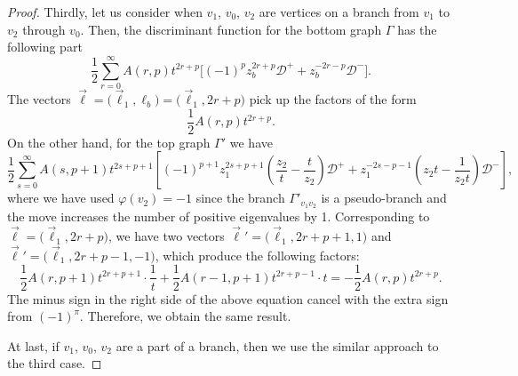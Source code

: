 \begin{proof}
	Thirdly, let us consider when $ v_1$, $v_0$, $v_2 $ are vertices on a branch from $ v_1 $ to $ v_2 $ through $ v_0 $. Then, the discriminant function for the bottom graph $ \Gamma $ has the following part
	\[
	\frac{1}{2}\sum_{r=0}^{\infty} A(r,p)t^{2r+p} \big[(-1)^p z_b^{2r+p}\mathcal{D}^{+}+z_b^{-2r-p}\mathcal{D}^{-}\big].
	\]
	The vectors $ \vec{\ell}=\big(\vec{\ell}_1,\ell_b\big)=\big(\vec{\ell}_1,2r+p\big) $ pick up the factors of the form
	\[
	\frac{1}{2}A(r,p)t^{2r+p}.
	\]
	On the other hand, for the top graph $ \Gamma' $ we have
	\[
	\frac{1}{2}\sum_{s=0}^{\infty}A(s,p+1)t^{2s+p+1}\left[(-1)^{p+1}z_1^{2s+p+1}\left(\frac{z_2}{t}-\frac{t}{z_2}\right)\mathcal{D}^{+}+z_1^{-2s-p-1}\left(z_2t-\frac{1}{z_2t}\right)\mathcal{D}^{-}\right],
	\]
	where we have used $ \varphi(v_2)=-1 $ since the branch $ \Gamma'_{v_1 v_2} $ is a pseudo-branch and the move increases the number of positive eigenvalues by 1. Corresponding to $ \vec{\ell}=\big(\vec{\ell}_1,2r+p\big) $, we have two vectors $ \vec{\ell}'=\big(\vec{\ell}_1,2r+p+1,1\big) $ and $ \vec{\ell}'=\big(\vec{\ell}_1,2r+p-1,-1\big) $, which produce the following factors:
	\[
	\frac{1}{2}A(r,p+1)t^{2r+p+1}\cdot\frac{1}{t}+\frac{1}{2}A(r-1,p+1)t^{2r+p-1}\cdot t=-\frac{1}{2}A(r,p)t^{2r+p}.
	\]
	The minus sign in the right side of the above equation cancel with the extra sign from $ (-1)^{\pi} $. Therefore, we obtain the same result.
	
	At last, if $ v_1$, $v_0$, $v_2 $ are a part of a branch, then we use the similar approach to the third case.
\end{proof}
